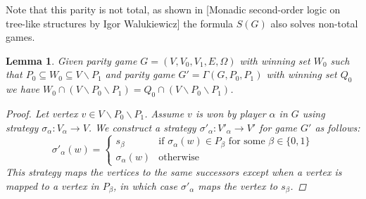 \documentclass[]{article}
\newtheorem{lemma}[theorem]{Lemma}
\begin{document}
	Note that this parity is not total, as shown in [Monadic second-order logic on tree-like structures by
	Igor Walukiewicz] the formula $S(G)$ also solves non-total games.
	\begin{lemma}
		\label{lem_gamma_same_winner}
		Given parity game $G=(V,V_0,V_1,E,\Omega)$ with winning set $W_0$ such that $P_0 \subseteq W_0 \subseteq V \backslash P_1$ and parity game $G' = \Gamma(G,P_0,P_1)$ with winning set $Q_0$ we have $W_0 \cap (V\backslash P_0 \backslash P_1) = Q_0 \cap (V\backslash P_0 \backslash P_1)$.
		\begin{proof}
			Let vertex $v\in V \backslash P_0 \backslash P_1$. Assume $v$ is won by player $\alpha$ in $G$ using strategy $\sigma_\alpha : V_\alpha \rightarrow V$. We construct a strategy $\sigma'_\alpha :  V'_\alpha \rightarrow V'$ for game $G'$ as follows:
			\[ \sigma'_\alpha(w) = \begin{cases} s_\beta & \text{if $\sigma_\alpha(w) \in P_\beta$ for some $\beta \in \{0,1\}$}\\
			\sigma_\alpha(w) & \text{otherwise}
			\end{cases} \]
			This strategy maps the vertices to the same successors except when a vertex is mapped to a vertex in $P_\beta$, in which case $\sigma'_\alpha$ maps the vertex to $s_\beta$.
			

\end{proof}
\end{lemma}
\end{document}
